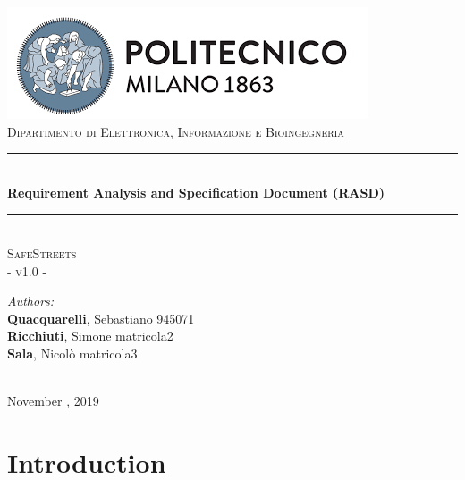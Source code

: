 \documentclass{article}
\begin{document}
    \begin{titlepage}
    
        \centering
		\vspace*{0.7 cm}
		\includegraphics[scale = 0.7]{images/PolimiLogo.png}\\[1 cm]
		\textsc{\large Dipartimento di Elettronica, Informazione e Bioingegneria}\\[2 cm]
		
		\rule{\linewidth}{0.2 mm} \\[0.5 cm]
		{\huge \bfseries Requirement Analysis and Specification Document (RASD)}\\
		\rule{\linewidth}{0.2 mm} \\[1.5 cm]
		
		\textsc{\Large SafeStreets}\\[0.5 cm]
		\textsc{\large - v1.0 -}\\[1 cm]

		\begin{minipage}{\textwidth}
            \begin{flushleft} \large
    				\emph{Authors:}\\
    				\textbf{Quacquarelli}, Sebastiano \hfill 945071 \\
    				\textbf{Ricchiuti}, Simone \hfill matricola2 \\
    				\textbf{Sala}, Nicolò \hfill matricola3 \\[2 cm]
    		\end{flushleft}
		\end{minipage}\\[2 cm]
		
        {\large November  , 2019}\\[2 cm]
        
    \end{titlepage}
    
    \tableofcontents
    
    \newpage
    
    \section{Introduction}
\end{document}
